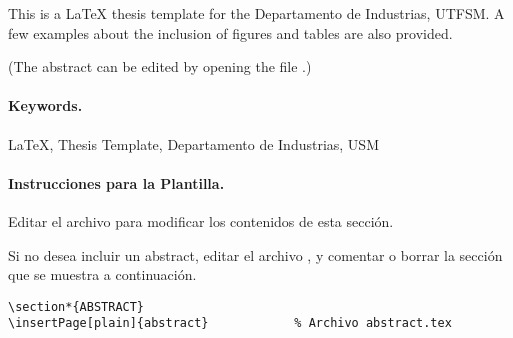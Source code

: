 
This is a \LaTeX{} thesis template for the Departamento de Industrias, UTFSM. A few examples about the inclusion of figures and tables are also provided.

(The abstract can be edited by opening the file .)

\vspace{20mm}

\paragraph{Keywords.}
\LaTeX{}, Thesis Template, Departamento de Industrias, USM

\vspace{20mm}


\paragraph{Instrucciones para la Plantilla.}

Editar el archivo  para modificar los contenidos de esta sección.

Si no desea incluir un abstract, editar el archivo , y comentar o borrar la sección que se muestra a continuación.

\begin{Verbatim}[frame=lines, label=\inlinecode{/memoria.tex} (extracto)
				, fontsize=\footnotesize
				, baselinestretch=1
				, formatcom=\color{gray}]
\section*{ABSTRACT}
\insertPage[plain]{abstract}			% Archivo abstract.tex
\end{Verbatim}